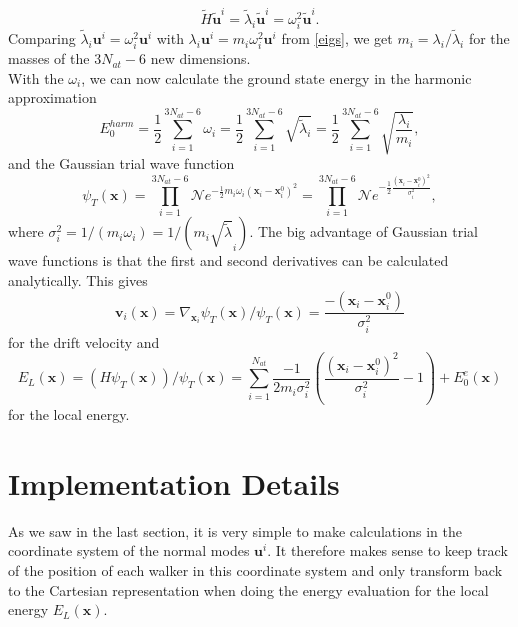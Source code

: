 \documentclass [12pt]{report}
\begin{document}
\begin{equation}
\tilde{H} \bm{\tilde{u}}^i = \tilde{\lambda}_i \bm{\tilde{u}}^i = \omega_i^2 \bm{\tilde{u}}^i.
\end{equation}
Comparing $\tilde{\lambda}_i \bm{u}^i = \omega_i^2 \bm{u}^i$ with $\lambda_i \bm{u}^i = m_i \omega_i^2 \bm{u}^i$ from \eqref{eigs}, we get $m_i = \lambda_i / \tilde{\lambda}_i$ for the masses of the $3 N_{at} - 6$ new dimensions.\\
With the $\omega_i$, we can now calculate the ground state energy in the harmonic approximation
\begin{equation}
E_0^{harm} = \frac{1}{2} \sum_{i=1}^{3N_{at}-6} \omega_i = \frac{1}{2}\sum_{i=1}^{3N_{at}-6}  \sqrt{\tilde{\lambda}_i} = \frac{1}{2} \sum_{i=1}^{3N_{at}-6}  \sqrt{\frac{\lambda_i}{m_i}},
\end{equation}
and the Gaussian trial wave function
\begin{equation}
\psi_T(\bm{x}) = \prod_{i=1}^{3N_{at}-6} \mathcal{N} e^{-\frac{1}{2} m_i \omega_i (\bm{x}_i - \bm{x}^0_i)^2} = \prod_{i=1}^{3N_{at}-6} \mathcal{N} e^{-\frac{1}{2} \frac{(\bm{x}_i - \bm{x}^0_i)^2}{\sigma_i^2}},
\end{equation}
where $\sigma_i^2 = 1/(m_i \omega_i) = 1/(m_i\sqrt{\tilde{\lambda}}_i)$. 
The big advantage of Gaussian trial wave functions is that the first and second derivatives can be calculated analytically. This gives
\begin{equation}
\bm{v}_i(\bm{x}) = \nabla_{\bm{x}_i} \psi_T(\bm{x})/ \psi_T(\bm{x}) = \frac{-(\bm{x}_i - \bm{x}^0_i)}{\sigma_i^2}
\end{equation}
for the drift velocity and 
\begin{equation}\label{el}
E_L(\bm{x}) = (H\psi_T(\bm{x}))/\psi_T(\bm{x}) = \sum_{i=1}^{N_{at}} \frac{-1}{2m_i \sigma^2_i} \left( \frac{(\bm{x}_i - \bm{x}^0_i)^2}{\sigma^2_i} - 1 \right) + E_0^e(\bm{x})
\end{equation}
for the local energy. 
\section{Implementation Details}
As we saw in the last section, it is very simple to make calculations in the coordinate system of the normal modes $\bm{u}^i$. It therefore makes sense to keep track of the position of each walker in this coordinate system and only transform back to the Cartesian representation when doing the energy evaluation for the local energy $E_L(\bm{x})$.
\end{document}
